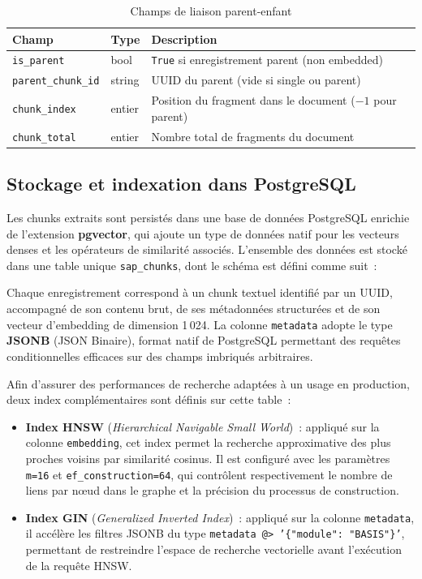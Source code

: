 \begin{table}[H]
\centering
\caption{Champs de liaison parent-enfant}
\label{tab:meta-hierarchy}
\begin{tabularx}{\textwidth}{@{}llX@{}}
\toprule
\textbf{Champ} & \textbf{Type} & \textbf{Description} \\
\midrule
\texttt{is\_parent}       & bool   & \texttt{True} si enregistrement parent (non embedded) \\
\texttt{parent\_chunk\_id} & string & UUID du parent (vide si single ou parent) \\
\texttt{chunk\_index}      & entier & Position du fragment dans le document ($-1$ pour parent) \\
\texttt{chunk\_total}      & entier & Nombre total de fragments du document \\
\bottomrule
\end{tabularx}
\end{table}

\subsection{Stockage et indexation dans PostgreSQL}

Les chunks extraits sont persistés dans une base de données PostgreSQL enrichie de
l'extension \textbf{pgvector}, qui ajoute un type de données natif pour les vecteurs
denses et les opérateurs de similarité associés. L'ensemble des données est stocké dans
une table unique \texttt{sap\_chunks}, dont le schéma est défini comme suit~:



Chaque enregistrement correspond à un chunk textuel identifié par un UUID, accompagné
de son contenu brut, de ses métadonnées structurées et de son vecteur d'embedding de
dimension 1\,024. La colonne \texttt{metadata} adopte le type \textbf{JSONB} (JSON
Binaire), format natif de PostgreSQL permettant des requêtes conditionnelles efficaces
sur des champs imbriqués arbitraires.

\medskip
Afin d'assurer des performances de recherche adaptées à un usage en production, deux
index complémentaires sont définis sur cette table~:

\begin{itemize}
    \item \textbf{Index HNSW} (\textit{Hierarchical Navigable Small World})~: appliqué
    sur la colonne \texttt{embedding}, cet index permet la recherche approximative des
    plus proches voisins par similarité cosinus. Il est configuré avec les paramètres
    \texttt{m=16} et \texttt{ef\_construction=64}, qui contrôlent respectivement le
    nombre de liens par nœud dans le graphe et la précision du processus de construction.

    \item \textbf{Index GIN} (\textit{Generalized Inverted Index})~: appliqué sur la
    colonne \texttt{metadata}, il accélère les filtres JSONB du type
    \texttt{metadata @> '\{"module": "BASIS"\}'}, permettant de restreindre l'espace de
    recherche vectorielle avant l'exécution de la requête HNSW.
\end{itemize}

